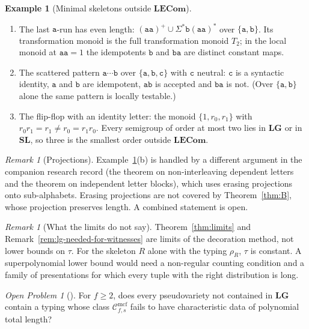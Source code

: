 \documentclass[11pt]{article}
\numberwithin{equation}{section}
\theoremstyle{plain}
\theoremstyle{definition}
\newtheorem{example}[theorem]{Example}
\theoremstyle{remark}
\newtheorem{remark}[theorem]{Remark}
\newtheorem{openproblem}[theorem]{Open Problem}
\theoremstyle{plain}
\newcommand{\Cmcf}[2]{\mathcal{C}^{\mathrm{mcf}}_{#1,#2}}
\newcommand{\LG}{\mathbf{LG}}
\newcommand{\SL}{\mathbf{SL}}
\newcommand{\LECom}{\mathbf{L}\mathbf{ECom}}
\begin{document}
\begin{example}[Minimal skeletons outside $\LECom$]
\label{ex:minimal}
\begin{enumerate}[label=(\alph*),leftmargin=*]
\item The last $\mathtt a$-run has even length: $(\mathtt{aa})^+\cup\Sigma^*\mathtt
b(\mathtt{aa})^*$ over $\{\mathtt a,\mathtt b\}$.  Its transformation monoid is
the full transformation monoid $T_2$; in the local monoid at $\mathtt{aa}=1$ the
idempotents $\mathtt b$ and $\mathtt{ba}$ are distinct constant maps.
\item The scattered pattern $\mathtt a\cdots\mathtt b$ over $\{\mathtt a,\mathtt
b,\mathtt c\}$ with $\mathtt c$ neutral: $\mathtt c$ is a syntactic identity,
$\mathtt a$ and $\mathtt b$ are idempotent, $\mathtt{ab}$ is accepted and
$\mathtt{ba}$ is not.  (Over $\{\mathtt a,\mathtt b\}$ alone the same pattern is
locally testable.)
\item The flip-flop with an identity letter: the monoid $\{1,r_0,r_1\}$ with
$r_0r_1=r_1\ne r_0=r_1r_0$.  Every semigroup of order at most two lies in $\LG$
or in $\SL$, so three is the smallest order outside $\LECom$.
\end{enumerate}
\end{example}

\begin{remark}[Projections]
\label{rem:projections}
Example~\ref{ex:minimal}(b) is handled by a different argument in the companion
research record \cite{KuriyamaCompendium} (the theorem on non-interleaving
dependent letters and the theorem on independent letter blocks), which uses
erasing projections onto sub-alphabets.  Erasing projections are not covered by
Theorem~\ref{thm:B}, whose projection preserves length.  A combined statement is
open.
\end{remark}

\begin{remark}[What the limits do not say]
Theorem~\ref{thm:limits} and Remark~\ref{rem:lg-needed-for-witnesses} are limits of
the decoration method, not lower bounds on $\tau$.  For the skeleton $R$ alone with
the typing $\rho_R$, $\tau$ is constant.  A superpolynomial lower bound would need
a non-regular counting condition and a family of presentations for which every
tuple with the right distribution is long.
\end{remark}

\begin{openproblem}[{\cite[Open Problem \textit{fanout-two}]{KuriyamaCompendium}}]
\label{op:fanout-two}
For $f\ge2$, does every pseudovariety not contained in $\LG$ contain a typing
whose class $\Cmcf{f}{s}$ fails to have characteristic data of polynomial total
length?
\end{openproblem}
\end{document}

